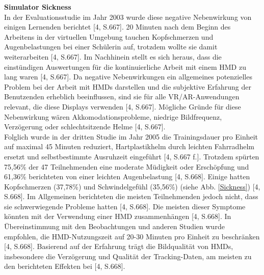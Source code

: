 \documentclass[deutsch]{llncs}
\begin{document}
\textbf{Simulator Sickness}\\
In der Evaluationsstudie im Jahr 2003 wurde diese negative Nebenwirkung von einigen Lernenden berichtet [4, S.667]. 20 Minuten nach dem Beginn des Arbeitens in der virtuellen Umgebung tauchen Kopfschmerzen und Augenbelastungen bei einer Schülerin auf, trotzdem wollte sie damit weiterarbeiten [4, S.667]. Im Nachhinein stellt es sich heraus, dass die einstündigen Auswertungen für die kontinuierliche Arbeit mit einem HMD zu lang waren [4, S.667]. Da negative Nebenwirkungen ein allgemeines potenzielles Problem bei der Arbeit mit HMDs darstellen und die subjektive Erfahrung der Benutzenden erheblich beeinflussen, sind sie für alle VR/AR-Anwendungen relevant, die diese Displays verwenden [4, S.667]. Mögliche Gründe für diese Nebenwirkung wären Akkomodationsprobleme, niedrige Bildfrequenz, Verzögerung oder schlechtsitzende Helme [4, S.667].\\
Folglich wurde in der dritten Studie im Jahr 2005 die Trainingsdauer pro Einheit auf maximal 45 Minuten reduziert, Hartplastikhelm durch leichten Fahrradhelm ersetzt und selbstbestimmte Ausruhzeit eingeführt [4, S.667 f.]. Trotzdem spürten 75,56\% der 47 Teilnehmenden eine moderate Müdigkeit oder Erschöpfung und 61,36\% berichteten von einer leichten Augenbelastung [4, S.668]. Einige hatten Kopfschmerzen (37,78\%) und Schwindelgefühl (35,56\%) (siehe Abb. \ref{Sickness}) [4, S.668]. Im Allgemeinen berichteten die meisten Teilnehmenden jedoch nicht, dass sie schwerwiegende Probleme hatten [4, S.668]. Die meisten dieser Symptome könnten mit der Verwendung einer HMD zusammenhängen [4, S.668]. In Übereinstimmung mit den Beobachtungen und anderen Studien wurde empfohlen, die HMD-Nutzungszeit auf 20-30 Minuten pro Einheit zu beschränken [4, S.668]. Basierend auf der Erfahrung trägt die Bildqualität von HMDs, insbesondere die Verzögerung und Qualität der Tracking-Daten, am meisten zu den berichteten Effekten bei [4, S.668].\\
\end{document}
